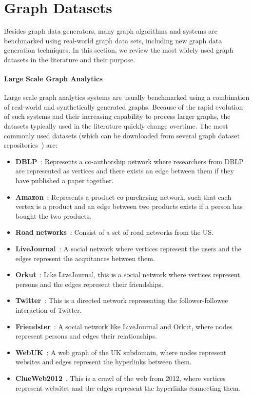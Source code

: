 \section{Graph Datasets}
\label{sec:data_sets}

Besides graph data generators, many graph algorithms and systems are benchmarked using real-world graph data sets, including new graph data generation techniques. In this section, we review the most widely used graph datasets in the literature and their purpose.


\paragraph{Large Scale Graph Analytics}

Large scale graph analytics systems are usually benchmarked using a combination of
real-world and synthetically generated graphs. Because of the rapid evolution of such
systems and their increasing capability to process larger graphs, the datasets
typically used  in the literature quickly change overtime. The most commonly
used datasets (which can be downloaded from several graph dataset
repositories~\cite{snapnets,lawalgo}) are:
\begin{itemize}
  \item \textbf{DBLP}~\cite{yang2015defining}: Represents a co-authorship network where
    researchers from DBLP are represented as vertices and there exists an edge
    between them if they have published a paper together.
  \item \textbf{Amazon}~\cite{yang2015defining}: Represents a product co-purchasing
    network, such that each vertex is a product and an edge between two products
    exists if a person has bought the two products.
  \item \textbf{Road networks}~\cite{leskovec2009community}: Consist of a set of road
    networks from the US.
  \item \textbf{LiveJournal}~\cite{yang2015defining}: A social network where vertices
    represent the users and the edges represent the acquitances between them.
  \item \textbf{Orkut}~\cite{yang2015defining}: Like LiveJournal, this is a social network
    where vertices represent persons and the edges represent their friendships.
  \item \textbf{Twitter}~\cite{kwak2010twitter}: This is a directed network representing
    the follower-followee interaction of Twitter.
  \item \textbf{Friendster}~\cite{yang2015defining}: A social network like LiveJournal and
    Orkut, where nodes represent persons and edges their relationships.
  \item \textbf{WebUK}~\cite{delis}: A web graph of the UK subdomain, where nodes represent
    websites and edges represent the hyperlinks between them.
  \item \textbf{ClueWeb2012}~\cite{clueweb}. This is a crawl of the web from 2012, where
    vertices represent websites and the edges represent the hyperlinks connecting them.
\end{itemize}

